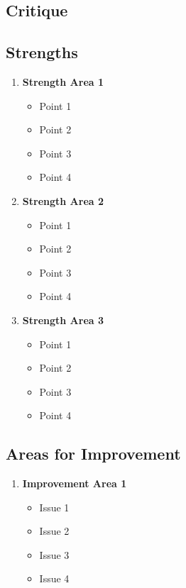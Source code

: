 \documentclass[10pt,a4paper]{article}
\begin{document}
\begin{multicols}{2}
\section*{Critique}

\subsection*{Strengths}
\begin{enumerate}\small
  \item \textbf{Strength Area 1}
    \begin{itemize}
      \item Point 1
      \item Point 2
      \item Point 3
      \item Point 4
    \end{itemize}
  
  \item \textbf{Strength Area 2}
    \begin{itemize}
      \item Point 1
      \item Point 2
      \item Point 3
      \item Point 4
    \end{itemize}
  
  \item \textbf{Strength Area 3}
    \begin{itemize}
      \item Point 1
      \item Point 2
      \item Point 3
      \item Point 4
    \end{itemize}
\end{enumerate}

\subsection*{Areas for Improvement}
\begin{enumerate}\small
  \item \textbf{Improvement Area 1}
    \begin{itemize}
      \item Issue 1
      \item Issue 2
      \item Issue 3
      \item Issue 4
    \end{itemize}
  

\end{enumerate}
\end{multicols}
\end{document}
